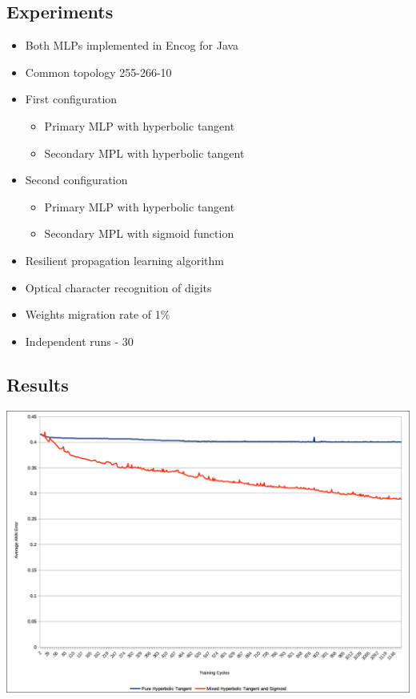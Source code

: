 \documentclass[a0,portrait,25pt]{sciposter}
\begin{document}
\begin{multicols}{3}
\begin{mdframed}[backgroundcolor=white,roundcorner=4pt,shadow=true,linewidth=1pt]
\section*{Experiments}
\begin{itemize}
\item Both MLPs implemented in Encog for Java
\item Common topology 255-266-10
\item First configuration
\begin{itemize}
  \item Primary MLP with hyperbolic tangent
  \item Secondary MPL with hyperbolic tangent
\end{itemize}
\item Second configuration
\begin{itemize}
  \item Primary MLP with hyperbolic tangent
  \item Secondary MPL with sigmoid function
\end{itemize}
\item Resilient propagation learning algorithm
\item Optical character recognition of digits
\item Weights migration rate of 1\%
\item Independent runs - 30
\end{itemize}
\end{mdframed}

\begin{mdframed}[backgroundcolor=white,roundcorner=4pt,shadow=true,linewidth=1pt]
\color{Black}
\section*{Results}
\begin{minipage}[c]{1\linewidth}
\includegraphics[width=0.9\linewidth]{fig04}
\end{minipage}
\end{mdframed}


\end{multicols}
\end{document}
